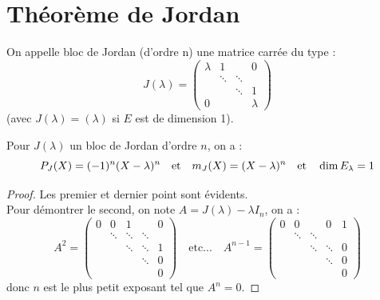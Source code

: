 \documentclass{article}
\begin{document}
\section{Théorème de Jordan}

\begin{defn}
On appelle bloc de Jordan (d'ordre n) une matrice carrée du type :
\[ J(\lambda) = \begin{pmatrix}
\lambda & 1 & & 0 \\
 & \ddots & \ddots & \\
 & & \ddots & 1 \\
 0 & & & \lambda
\end{pmatrix} \]
(avec $J(\lambda) = (\lambda)$ si $E$ est de dimension 1).
\end{defn}

\begin{prop}
\label{prop:blocJordan}
Pour $J(\lambda)$ un bloc de Jordan d'ordre $n$, on a :
\[ P_J(X) = (-1)^n(X-\lambda)^n \quad \text{et} \quad
m_J(X) = (X-\lambda)^n \quad \text{et} \quad
\dim{E_{\lambda}} = 1
\]
\end{prop}

\begin{proof}
Les premier et dernier point sont évidents. \\
Pour démontrer le second, on note $A = J(\lambda) - \lambda I_n$, on a :
\[ A^2 = 
\begin{pmatrix}
0 & 0 & 1 & & 0 \\
 & \ddots & \ddots & \ddots &  \\
 & & \ddots & \ddots & 1 \\
  & & & \ddots & 0 \\
  & & & & 0
\end{pmatrix} \quad \text{etc...} \quad A^{n-1} = 
\begin{pmatrix}
0 & 0 & & 0 & 1 \\
 & \ddots & \ddots & &  \\
 & & \ddots & \ddots & 0 \\
  & & & \ddots & 0 \\
   & & & & 0
\end{pmatrix} 
\]
donc $n$ est le plus petit exposant tel que $A^n=0$.
\end{proof}
\end{document}
